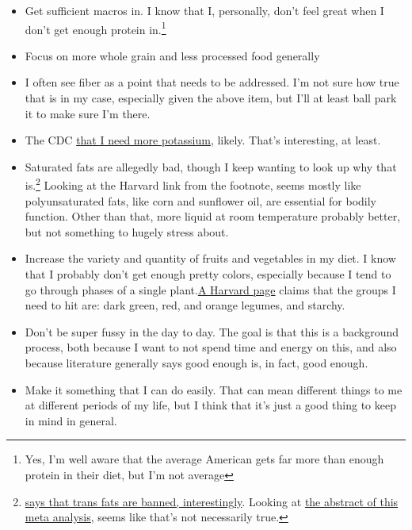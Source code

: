 \documentclass[12pt]{article}[titlepage]
\renewcommand{\,}{\textsuperscript{,}}
\begin{document}
\begin{itemize}  
\item Get sufficient macros in. I know that I, personally, don't feel great when I don't get enough protein in.\footnote{Yes, I'm well aware that the average American gets far more than enough protein in their diet, but I'm not average}  
\item Focus on more whole grain and less processed food generally  
\item I often see fiber as a point that needs to be addressed. I'm not sure how true that is in my case, especially given the above item, but I'll at least ball park it to make sure I'm there.  
\item The CDC \href{https://www.cdc.gov/nccdphp/dnpao/features/healthy-eating-tips/index.html}{that I need more potassium}, likely. That's interesting, at least.  
\item Saturated fats are allegedly bad, though I keep wanting to look up why that is.\footnote{\href{https://www.health.harvard.edu/staying-healthy/the-truth-about-fats-bad-and-good}{says that trans fats are banned, interestingly}. Looking at \href{https://pubmed.ncbi.nlm.nih.gov/20071648/}{the abstract of this meta analysis}, seems like that's not necessarily true.} Looking at the Harvard link from the footnote, seems mostly like polyunsaturated fats, like corn and sunflower oil, are essential for bodily function. Other than that, more liquid at room temperature probably better, but not something to hugely stress about.  
\item Increase the variety and quantity of fruits and vegetables in my diet. I know that I probably don't get enough pretty colors, especially because I tend to go through phases of a single plant.\href{https://www.health.harvard.edu/healthbeat/how-the-dietary-guidelines-define-a-healthy-eating-pattern}{A Harvard page} claims that the groups I need to hit are: dark green, red, and orange legumes, and starchy.  
\item Don't be super fussy in the day to day. The goal is that this is a background process, both because I want to not spend time and energy on this, and also because literature generally says good enough is, in fact, good enough.  
\item Make it something that I can do easily. That can mean different things to me at different periods of my life, but I think that it's just a good thing to keep in mind in general.  
\end{itemize}
\end{document}
